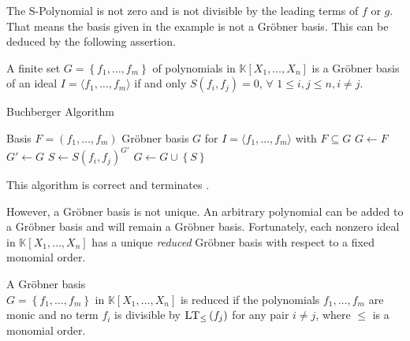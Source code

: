 The S-Polynomial is not zero and is not divisible by the leading terms of $f$ or $g$. That means the basis given in the example is not a Gröbner basis. This can be deduced by the following assertion.

\begin{env_definition}
\cite{KHZ} A finite set $G = \left\lbrace f_{1}, \dots , f_{m} \right\rbrace$ of polynomials in $ \mathbb{K}\left[X_{1}, \dots, X_{n}\right] $ is a Gröbner basis of an ideal 
$I = \langle f_{1}, \dots , f_{m} \rangle $ if and only $S\left( f_{i},f_{j}\right) = 0$, $ \forall$  $1 \leq i,j \leq n, i\neq j.$

\end{env_definition}

\begin{algorithm}
\caption{Buchberger Algorithm \cite{KHZ}}
\label{alg:buchberger}
\begin{algorithmic}[1]
\Require Basis $F = \left( f_{1}, \dots, f_{m} \right)  $
\Ensure Gröbner basis $G$ for $I = \langle f_{1}, \dots, f_{m} \rangle $ with $ F \subseteq G $
\State $G \gets F$
\Repeat
\State $G'\gets G $
\State $S \gets S\left( f_{i},f_{j} \right)^{G'}  $ 
\State $G \gets G \cup \left\lbrace S\right\rbrace $
\EndIf
\EndFor
{}

\end{algorithmic}
\end{algorithm}

This algorithm is correct and terminates \cite{KHZ}.

\newpage

However, a Gröbner basis is not unique. An arbitrary polynomial can be added to a Gröbner basis and will remain a Gröbner basis.
Fortunately, each nonzero ideal in $\mathbb{K}\left[X_{1}, \dots, X_{n}\right]$ has a unique \textit{reduced} Gröbner basis with respect to a fixed monomial order.

\begin{env_definition}
\cite{KHZ}
A Gröbner basis \\ $G= \left\lbrace  f_{1}, \dots , f_{m} \right\rbrace  $ in 
$ \mathbb{K}\left[X_{1}, \dots, X_{n}\right] $ is reduced if the polynomials $f_{1},\dots , f_{m} $ are monic and no term $f_{i}$ is divisible by $ \textsc{LT}_{\leq }\left( f_{j}\right)$ for any pair $i\neq j$, where $\leq$ is a monomial order.
\end{env_definition}


